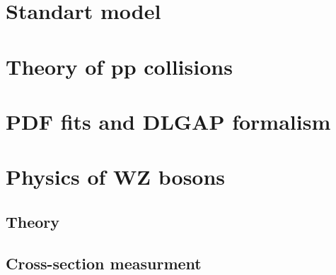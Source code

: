\chapter{Standart model}
\chapter{Theory of pp collisions}
\chapter{PDF fits and DLGAP formalism}
\chapter{Physics of WZ bosons}
\section{Theory}
\section{Cross-section measurment}